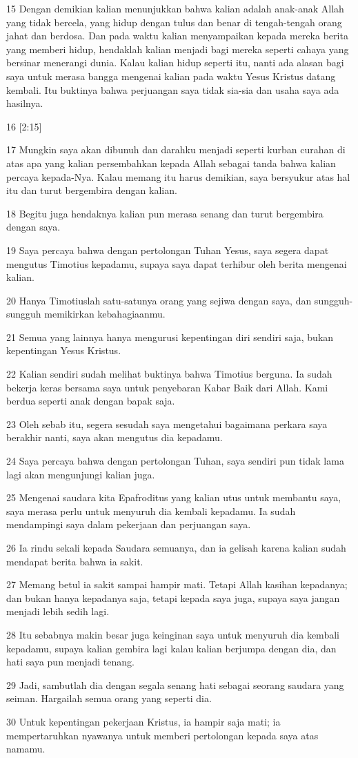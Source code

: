 \par 15 Dengan demikian kalian menunjukkan bahwa kalian adalah anak-anak Allah yang tidak bercela, yang hidup dengan tulus dan benar di tengah-tengah orang jahat dan berdosa. Dan pada waktu kalian menyampaikan kepada mereka berita yang memberi hidup, hendaklah kalian menjadi bagi mereka seperti cahaya yang bersinar menerangi dunia. Kalau kalian hidup seperti itu, nanti ada alasan bagi saya untuk merasa bangga mengenai kalian pada waktu Yesus Kristus datang kembali. Itu buktinya bahwa perjuangan saya tidak sia-sia dan usaha saya ada hasilnya.
\par 16 [2:15]
\par 17 Mungkin saya akan dibunuh dan darahku menjadi seperti kurban curahan di atas apa yang kalian persembahkan kepada Allah sebagai tanda bahwa kalian percaya kepada-Nya. Kalau memang itu harus demikian, saya bersyukur atas hal itu dan turut bergembira dengan kalian.
\par 18 Begitu juga hendaknya kalian pun merasa senang dan turut bergembira dengan saya.
\par 19 Saya percaya bahwa dengan pertolongan Tuhan Yesus, saya segera dapat mengutus Timotius kepadamu, supaya saya dapat terhibur oleh berita mengenai kalian.
\par 20 Hanya Timotiuslah satu-satunya orang yang sejiwa dengan saya, dan sungguh-sungguh memikirkan kebahagiaanmu.
\par 21 Semua yang lainnya hanya mengurusi kepentingan diri sendiri saja, bukan kepentingan Yesus Kristus.
\par 22 Kalian sendiri sudah melihat buktinya bahwa Timotius berguna. Ia sudah bekerja keras bersama saya untuk penyebaran Kabar Baik dari Allah. Kami berdua seperti anak dengan bapak saja.
\par 23 Oleh sebab itu, segera sesudah saya mengetahui bagaimana perkara saya berakhir nanti, saya akan mengutus dia kepadamu.
\par 24 Saya percaya bahwa dengan pertolongan Tuhan, saya sendiri pun tidak lama lagi akan mengunjungi kalian juga.
\par 25 Mengenai saudara kita Epafroditus yang kalian utus untuk membantu saya, saya merasa perlu untuk menyuruh dia kembali kepadamu. Ia sudah mendampingi saya dalam pekerjaan dan perjuangan saya.
\par 26 Ia rindu sekali kepada Saudara semuanya, dan ia gelisah karena kalian sudah mendapat berita bahwa ia sakit.
\par 27 Memang betul ia sakit sampai hampir mati. Tetapi Allah kasihan kepadanya; dan bukan hanya kepadanya saja, tetapi kepada saya juga, supaya saya jangan menjadi lebih sedih lagi.
\par 28 Itu sebabnya makin besar juga keinginan saya untuk menyuruh dia kembali kepadamu, supaya kalian gembira lagi kalau kalian berjumpa dengan dia, dan hati saya pun menjadi tenang.
\par 29 Jadi, sambutlah dia dengan segala senang hati sebagai seorang saudara yang seiman. Hargailah semua orang yang seperti dia.
\par 30 Untuk kepentingan pekerjaan Kristus, ia hampir saja mati; ia mempertaruhkan nyawanya untuk memberi pertolongan kepada saya atas namamu.

